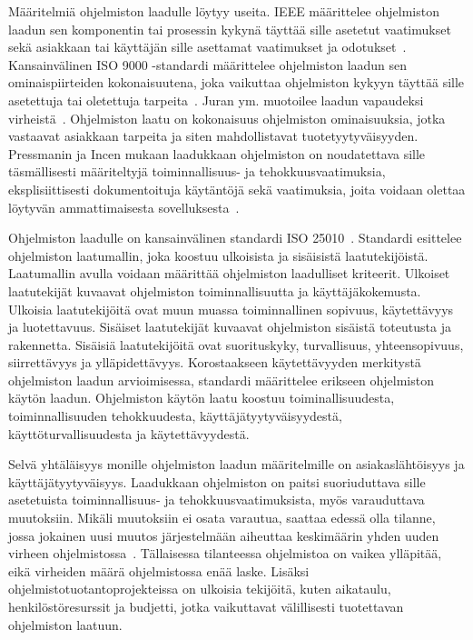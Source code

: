 \documentclass[finnish]{tktltiki2}
\theoremstyle{definition}
\theoremstyle{remark}
\begin{document}
Määritelmiä ohjelmiston laadulle löytyy useita. IEEE määrittelee ohjelmiston laadun sen komponentin tai prosessin kykynä täyttää sille asetetut vaatimukset sekä asiakkaan tai käyttäjän sille asettamat vaatimukset ja odotukset~\cite{IEEE90}. Kansainvälinen ISO 9000 -standardi määrittelee ohjelmiston laadun sen ominaispiirteiden kokonaisuutena, joka vaikuttaa ohjelmiston kykyyn täyttää sille asetettuja tai oletettuja tarpeita~\cite{ISO9000, MD06}. Juran ym. muotoilee laadun vapaudeksi virheistä~\cite{JGB74}. Ohjelmiston laatu on kokonaisuus ohjelmiston ominaisuuksia, jotka vastaavat asiakkaan tarpeita ja siten mahdollistavat tuotetyytyväisyyden. Pressmanin ja Incen mukaan laadukkaan ohjelmiston on noudatettava sille täsmällisesti määriteltyjä toiminnallisuus- ja tehokkuusvaatimuksia, eksplisiittisesti dokumentoituja käytäntöjä sekä vaatimuksia, joita voidaan olettaa löytyvän ammattimaisesta sovelluksesta~\cite{PI92}.

Ohjelmiston laadulle on kansainvälinen standardi ISO 25010~\cite{ISO25010}. Standardi esittelee ohjelmiston laatumallin, joka koostuu ulkoisista ja sisäisistä laatutekijöistä. Laatumallin avulla voidaan määrittää ohjelmiston laadulliset kriteerit. Ulkoiset laatutekijät kuvaavat ohjelmiston toiminnallisuutta ja käyttäjäkokemusta. Ulkoisia laatutekijöitä ovat muun muassa toiminnallinen sopivuus, käytettävyys ja luotettavuus. Sisäiset laatutekijät kuvaavat ohjelmiston sisäistä toteutusta ja rakennetta. Sisäisiä laatutekijöitä ovat suorituskyky, turvallisuus, yhteensopivuus, siirrettävyys ja ylläpidettävyys. Korostaakseen käytettävyyden merkitystä ohjelmiston laadun arvioimisessa, standardi määrittelee erikseen ohjelmiston käytön laadun. Ohjelmiston käytön laatu koostuu toiminallisuudesta, toiminnallisuuden tehokkuudesta, käyttäjätyytyväisyydestä, käyttöturvallisuudesta ja käytettävyydestä.

Selvä yhtäläisyys monille ohjelmiston laadun määritelmille on asiakaslähtöisyys ja käyttäjätyytyväisyys. Laadukkaan ohjelmiston on paitsi suoriuduttava sille asetetuista toiminnallisuus- ja tehokkuusvaatimuksista, myös varauduttava muutoksiin. Mikäli muutoksiin ei osata varautua, saattaa edessä olla tilanne, jossa jokainen uusi muutos järjestelmään aiheuttaa keskimäärin yhden uuden virheen ohjelmistossa~\cite{LB85}. Tällaisessa tilanteessa ohjelmistoa on vaikea ylläpitää, eikä virheiden määrä ohjelmistossa enää laske. Lisäksi ohjelmistotuotantoprojekteissa on ulkoisia tekijöitä, kuten aikataulu, henkilöstöresurssit ja budjetti, jotka vaikuttavat välillisesti tuotettavan ohjelmiston laatuun.
\end{document}
